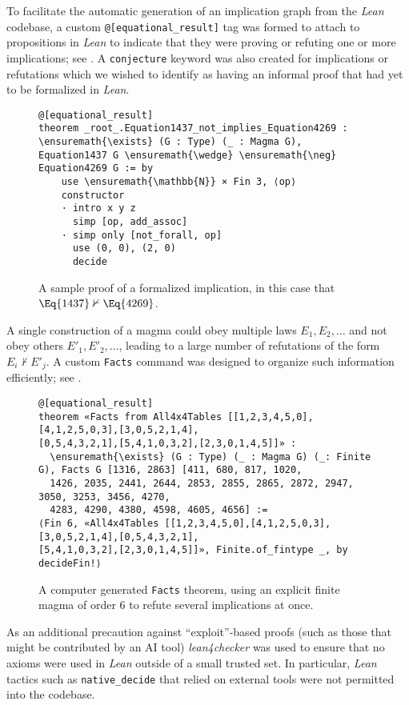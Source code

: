 To facilitate the automatic generation of an implication graph from the \emph{Lean} codebase, a custom \texttt{@{[}equational\_result{]}} tag was formed to attach to  propositions in \emph{Lean} to indicate that they were proving or refuting one or more implications; see .  A \texttt{conjecture} keyword was also created for implications or refutations which we wished to identify as having an informal proof that had yet to be formalized in \emph{Lean}.

\begin{figure}
\centering
\begin{Verbatim}
@[equational_result]
theorem _root_.Equation1437_not_implies_Equation4269 : \ensuremath{\exists} (G : Type) (_ : Magma G),
Equation1437 G \ensuremath{\wedge} \ensuremath{\neg} Equation4269 G := by
    use \ensuremath{\mathbb{N}} × Fin 3, ⟨op⟩
    constructor
    · intro x y z
      simp [op, add_assoc]
    · simp only [not_forall, op]
      use (0, 0), (2, 0)
      decide
\end{Verbatim}
\caption{A sample proof of a formalized implication, in this case that $\Eq{1437} \nvdash \Eq{4269}$.}
\label{fig:impl}
\end{figure}

A single construction of a magma could obey multiple laws $E_1,E_2,\dots$ and not obey others $E'_1, E'_2, \dots$, leading to a large number of refutations of the form $E_i \nvdash E'_j$.  A custom \texttt{Facts} command was designed to organize such information efficiently; see .

\begin{figure}
\centering
\begin{Verbatim}
@[equational_result]
theorem «Facts from All4x4Tables [[1,2,3,4,5,0],[4,1,2,5,0,3],[3,0,5,2,1,4],
[0,5,4,3,2,1],[5,4,1,0,3,2],[2,3,0,1,4,5]]» :
  \ensuremath{\exists} (G : Type) (_ : Magma G) (_: Finite G), Facts G [1316, 2863] [411, 680, 817, 1020,
  1426, 2035, 2441, 2644, 2853, 2855, 2865, 2872, 2947, 3050, 3253, 3456, 4270,
  4283, 4290, 4380, 4598, 4605, 4656] :=
⟨Fin 6, «All4x4Tables [[1,2,3,4,5,0],[4,1,2,5,0,3],[3,0,5,2,1,4],[0,5,4,3,2,1],
[5,4,1,0,3,2],[2,3,0,1,4,5]]», Finite.of_fintype _, by decideFin!⟩
\end{Verbatim}
\caption{A computer generated \texttt{Facts} theorem, using an explicit finite magma of order $6$ to refute several implications at once.}
\label{fig:facts}
\end{figure}

As an additional precaution against ``exploit''-based proofs (such as those that might be contributed by an AI tool) \emph{lean4checker} was used to ensure that no axioms were used in \emph{Lean} outside of a small trusted set.  In particular, \emph{Lean} tactics such as \texttt{native\_decide} that relied on external tools were not permitted into the codebase. 

